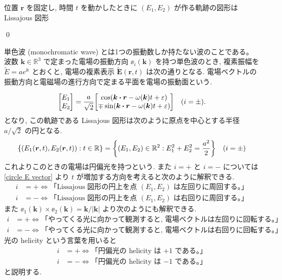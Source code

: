 \documentclass[uplatex,dvipdfmx,a4paper,11pt]{jlreq}
\makeatletter
\newcommand{\RR}{\mathbb{R}}
\newcommand{\EE}{\bm{E}}
\newcommand{\rr}{\bm{r}}
\newcommand{\kk}{\bm{k}}
\theoremstyle{definition}
\renewenvironment{proof}[1][\proofname]{\par
  \normalfont
  \topsep6\p@\@plus6\p@ \trivlist
  \item[\hskip\labelsep{\bfseries #1}\@addpunct{\bfseries}]\ignorespaces\quad\par
}{%
  \qed\endtrivlist\@endpefalse
}
\renewcommand\proofname{証明}
\makeatother
\begin{document}
\begin{theorem}
  位置 $\rr$ を固定し, 時間 $t$ を動かしたときに $(E_1, E_2)$ が作る軌跡の図形は Lissajous 図形
\end{theorem}
\begin{proof}

\end{proof}

\begin{definition}[単色波]
  単色波 (monochromatic wave) とは1つの振動数しか持たない波のことである。
  波数 $\kk\in\RR^3$ で定まった電場の振動方向 $\ee_i(\kk)$ を持つ単色波のとき, 複素振幅を $\tilde{E} = ae^{\ii\epsilon}$ とおくと, 電場の複素表示 $\tilde{\EE}(\rr, t)$ は次の通りとなる.
  電場ベクトルの振動方向と電磁場の進行方向で定まる平面を電場の振動面という.
\end{definition}


\begin{equation}
  \mqty[E_1 \\ E_2] = \frac{a}{\sqrt{2}}\mqty[\cos(\kk\vdot\rr - \omega(\kk)t + \varepsilon) \\ \mp\sin(\kk\vdot\rr - \omega(\kk)t + \varepsilon)] \quad (i = \pm). \label{circle E vector}
\end{equation}
となり, この軌跡である Lissajous 図形は次のように原点を中心とする半径 $a/\sqrt{2}$ の円となる.
\begin{align}
  \qty{\qty(E_1(\rr, t), E_2(\rr, t)):t\in\RR} = \qty{\qty(E_1, E_2)\in\RR^2:E_1^2 + E_2^2 = \frac{a^2}{2}} \quad (i=\pm)
\end{align}
これよりこのときの電場は円偏光を持つという. また $i = +$ と $i = -$ については \eqref{circle E vector} より $t$ が増加する方向を考えると次のように解釈できる.
\begin{align}
  i & = + \iff \text{「Lissajous 図形の円上を点 $(E_1, E_2)$ は左回りに周回する。」} \\
  i & = - \iff \text{「Lissajous 図形の円上を点 $(E_1, E_2)$ は右回りに周回する。」}
\end{align}
また $\ee_1(\kk)\times\ee_2(\kk) = \kk/|\kk|$ より次のようにも解釈できる.
\begin{align}
  i & = + \iff \text{「やってくる光に向かって観測すると, 電場ベクトルは左回りに回転する。」} \\
  i & = - \iff \text{「やってくる光に向かって観測すると, 電場ベクトルは右回りに回転する。」}
\end{align}
光の helicity という言葉を用いると
\begin{align}
  i & = + \iff \text{「円偏光の helicity は $+1$ である。」} \\
  i & = - \iff \text{「円偏光の helicity は $-1$ である。」}
\end{align}
と説明する.
\end{document}
